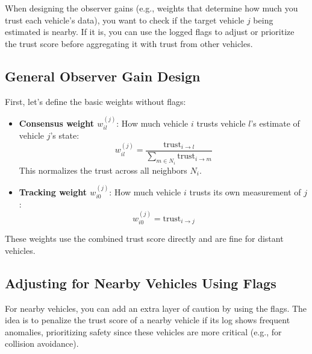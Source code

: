 \documentclass{article}
\begin{document}
When designing the observer gains (e.g., weights that determine how much you trust each vehicle's data), you want to check if the target vehicle \( j \) being estimated is nearby. If it is, you can use the logged flags to adjust or prioritize the trust score before aggregating it with trust from other vehicles.

\subsection{General Observer Gain Design}

First, let's define the basic weights without flags:
\begin{itemize}
    \item \textbf{Consensus weight \( w_{il}^{(j)} \)}: How much vehicle \( i \) trusts vehicle \( l \)'s estimate of vehicle \( j \)'s state:
    \[
    w_{il}^{(j)} = \frac{\text{trust}_{i \to l}}{\sum_{m \in N_i} \text{trust}_{i \to m}}
    \]
    This normalizes the trust across all neighbors \( N_i \).
    
    \item \textbf{Tracking weight \( w_{i0}^{(j)} \)}: How much vehicle \( i \) trusts its own measurement of \( j \):
    \[
    w_{i0}^{(j)} = \text{trust}_{i \to j}
    \]
\end{itemize}

These weights use the combined trust score directly and are fine for distant vehicles.

\subsection{Adjusting for Nearby Vehicles Using Flags}

For nearby vehicles, you can add an extra layer of caution by using the flags. The idea is to penalize the trust score of a nearby vehicle if its log shows frequent anomalies, prioritizing safety since these vehicles are more critical (e.g., for collision avoidance).
\end{document}
